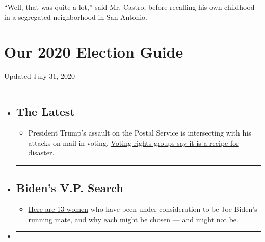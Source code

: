 ``Well, that was quite a lot,'' said Mr. Castro, before recalling his
own childhood in a segregated neighborhood in San Antonio.

\hypertarget{our-2020-election-guide}{%
\section{Our 2020 Election Guide}\label{our-2020-election-guide}}

Updated July 31, 2020

\begin{itemize}
\item
  \begin{center}\rule{0.5\linewidth}{\linethickness}\end{center}

  \hypertarget{the-latest}{%
  \subsection{The Latest}\label{the-latest}}

  \begin{itemize}
  \tightlist
  \item
    President Trump's assault on the Postal Service is intersecting with
    his attacks on mail-in voting.
    \href{https://www.nytimes.com/2020/07/31/us/politics/trump-usps-mail-delays.html?action=click\&pgtype=Article\&state=default\&region=BELOW_MAIN_CONTENT\&context=storylines_guide}{Voting
    rights groups say it is a recipe for disaster.}
  \end{itemize}
\item
  \begin{center}\rule{0.5\linewidth}{\linethickness}\end{center}

  \hypertarget{bidens-vp-search}{%
  \subsection{Biden's V.P. Search}\label{bidens-vp-search}}

  \begin{itemize}
  \tightlist
  \item
    \href{https://www.nytimes.com/article/biden-vice-president-2020.html?action=click\&pgtype=Article\&state=default\&region=BELOW_MAIN_CONTENT\&context=storylines_guide}{Here
    are 13 women} who have been under consideration to be Joe Biden's
    running mate, and why each might be chosen --- and might not be.
  \end{itemize}
\item
  \begin{center}\rule{0.5\linewidth}{\linethickness}\end{center}


\end{itemize}
